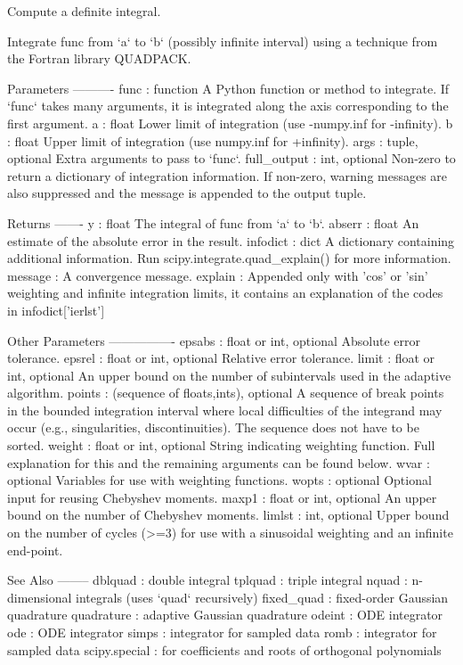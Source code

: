 \begin{DoxyVerb}Compute a definite integral.

Integrate func from `a` to `b` (possibly infinite interval) using a
technique from the Fortran library QUADPACK.

Parameters
----------
func : function
    A Python function or method to integrate.  If `func` takes many
    arguments, it is integrated along the axis corresponding to the
    first argument.
a : float
    Lower limit of integration (use -numpy.inf for -infinity).
b : float
    Upper limit of integration (use numpy.inf for +infinity).
args : tuple, optional
    Extra arguments to pass to `func`.
full_output : int, optional
    Non-zero to return a dictionary of integration information.
    If non-zero, warning messages are also suppressed and the
    message is appended to the output tuple.

Returns
-------
y : float
    The integral of func from `a` to `b`.
abserr : float
    An estimate of the absolute error in the result.
infodict : dict
    A dictionary containing additional information.
    Run scipy.integrate.quad_explain() for more information.
message :
    A convergence message.
explain :
    Appended only with 'cos' or 'sin' weighting and infinite
    integration limits, it contains an explanation of the codes in
    infodict['ierlst']

Other Parameters
----------------
epsabs : float or int, optional
    Absolute error tolerance.
epsrel : float or int, optional
    Relative error tolerance.
limit : float or int, optional
    An upper bound on the number of subintervals used in the adaptive
    algorithm.
points : (sequence of floats,ints), optional
    A sequence of break points in the bounded integration interval
    where local difficulties of the integrand may occur (e.g.,
    singularities, discontinuities). The sequence does not have
    to be sorted.
weight : float or int, optional
    String indicating weighting function. Full explanation for this
    and the remaining arguments can be found below.
wvar : optional
    Variables for use with weighting functions.
wopts : optional
    Optional input for reusing Chebyshev moments.
maxp1 : float or int, optional
    An upper bound on the number of Chebyshev moments.
limlst : int, optional
    Upper bound on the number of cycles (>=3) for use with a sinusoidal
    weighting and an infinite end-point.

See Also
--------
dblquad : double integral
tplquad : triple integral
nquad : n-dimensional integrals (uses `quad` recursively)
fixed_quad : fixed-order Gaussian quadrature
quadrature : adaptive Gaussian quadrature
odeint : ODE integrator
ode : ODE integrator
simps : integrator for sampled data
romb : integrator for sampled data
scipy.special : for coefficients and roots of orthogonal polynomials


\end{DoxyVerb}
